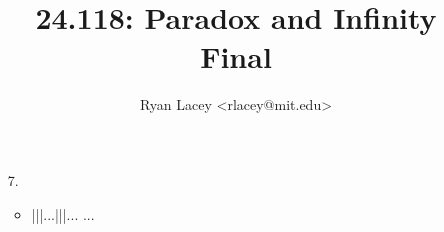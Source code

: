 \documentclass{article}
\begin{document}

\title{24.118: Paradox and Infinity\\Final}
\author{
  Ryan Lacey <rlacey@mit.edu>\\
}
        
\maketitle
        


\begin{enumerate}
\item[7.]
	\begin{itemize}
	\item
		|||...|||... ...
	\end{itemize}

\end{enumerate}
\end{document}
